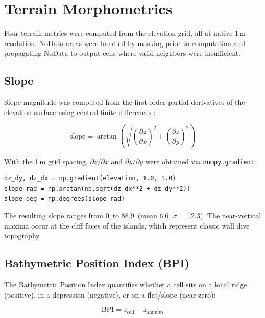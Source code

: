 \documentclass[a4paper,11pt]{article}
\begin{document}
\section{Terrain Morphometrics}
\label{sec:metrics}

Four terrain metrics were computed from the elevation grid, all at native 1\,m resolution.
NoData areas were handled by masking prior to computation and propagating NoData to output
cells where valid neighbors were insufficient.

\subsection{Slope}
\label{sec:slope}

Slope magnitude was computed from the first-order partial derivatives of the elevation
surface using central finite differences \citep{wilson2007}:

\begin{equation}
\text{slope} = \arctan\!\left(\sqrt{\left(\frac{\partial z}{\partial x}\right)^{\!2} +
\left(\frac{\partial z}{\partial y}\right)^{\!2}}\right)
\label{eq:slope}
\end{equation}

With the 1\,m grid spacing, $\partial z / \partial x$ and $\partial z / \partial y$ were
obtained via \texttt{numpy.gradient}:

\begin{lstlisting}
dz_dy, dz_dx = np.gradient(elevation, 1.0, 1.0)
slope_rad = np.arctan(np.sqrt(dz_dx**2 + dz_dy**2))
slope_deg = np.degrees(slope_rad)
\end{lstlisting}

The resulting slope ranges from 0\textdegree\ to 88.9\textdegree\ (mean
6.6\textdegree, $\sigma$ = 12.3\textdegree). The near-vertical maxima occur at the
cliff faces of the islands, which represent classic wall dive topography.

\subsection{Bathymetric Position Index (BPI)}
\label{sec:bpi}

The Bathymetric Position Index \citep{lundblad2006} quantifies whether a cell sits on a
local ridge (positive), in a depression (negative), or on a flat/slope (near zero):

\begin{equation}
\text{BPI} = z_{\text{cell}} - \overline{z}_{\text{annulus}}
\label{eq:bpi}
\end{equation}
\end{document}
